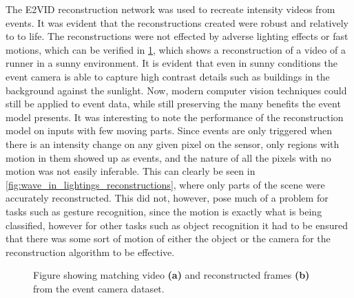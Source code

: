 The E2VID reconstruction network was used to recreate intensity videos from events. It was evident that the reconstructions created were robust and relatively to to life. The reconstructions were not effected by adverse lighting effects or fast motions, which can be verified in \cref{fig:intensity_reconstructed_frames}, which shows a reconstruction of a video of a runner in a sunny environment. It is evident that even in sunny conditions the event camera is able to capture high contrast details such as buildings in the background against the sunlight. Now, modern computer vision techniques could still be applied to event data, while still preserving the many benefits the event model presents. It was interesting to note the performance of the reconstruction model on inputs with few moving parts. Since events are only triggered when there is an intensity change on any given pixel on the sensor, only regions with motion in them showed up as events, and the nature of all the pixels with no motion was not easily inferable. This can clearly be seen in \cref{fig:wave_in_lightings_reconstructions}, where only parts of the scene were accurately reconstructed. This did not, however, pose much of a problem for tasks such as gesture recognition, since the motion is exactly what is being classified, however for other tasks such as object recognition it had to be ensured that there was some sort of motion of either the object or the camera for the reconstruction algorithm to be effective.

\begin{figure}[htb]%
    \centering
    \qquad
    \caption{Figure showing matching video \textbf{(a)} and reconstructed frames \textbf{(b)} from the event camera dataset\cite{EventCameraDataset}.}%
    \label{fig:intensity_reconstructed_frames}%
\end{figure}

